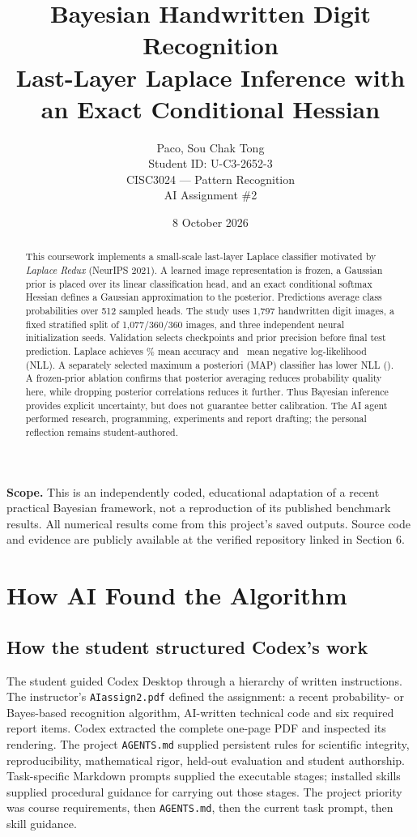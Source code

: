 \documentclass[10pt,a4paper]{article}
\title{\textbf{Bayesian Handwritten Digit Recognition}\\
Last-Layer Laplace Inference with an Exact Conditional Hessian}
\author{Paco, Sou Chak Tong\\Student ID: U-C3-2652-3\\
CISC3024 --- Pattern Recognition\\AI Assignment \#2}
\date{8 October 2026}
\begin{document}
\maketitle
\begin{abstract}
This coursework implements a small-scale last-layer Laplace classifier motivated by
\emph{Laplace Redux} (NeurIPS 2021). A learned image representation is frozen,
a Gaussian prior is placed over its linear classification head, and an exact
conditional softmax Hessian defines a Gaussian approximation to the posterior.
Predictions average class probabilities over 512 sampled heads. The study uses
1,797 handwritten digit images, a fixed stratified split of 1,077/360/360 images,
and three independent neural initialization seeds. Validation selects checkpoints
and prior precision before final test prediction. Laplace achieves
\LaplaceAcc\% mean accuracy and \LaplaceNLL\ mean negative log-likelihood (NLL).
A separately selected maximum a posteriori (MAP) classifier has lower NLL
(\MapNLL). A frozen-prior ablation confirms that posterior averaging reduces
probability quality here, while dropping posterior correlations reduces it further.
Thus Bayesian inference provides explicit uncertainty, but does not guarantee
better calibration. The AI agent performed research, programming, experiments and
report drafting; the personal reflection remains student-authored.
\end{abstract}
\textbf{Scope.} This is an independently coded, educational adaptation of a
recent practical Bayesian framework, not a reproduction of its published
benchmark results. All numerical results come from this project's saved
outputs. Source code and evidence are publicly available at the verified
repository linked in Section 6.
\tableofcontents
\clearpage

\section{How AI Found the Algorithm}
\subsection{How the student structured Codex's work}
The student guided Codex Desktop through a hierarchy of written instructions.
The instructor's \texttt{AIassign2.pdf} defined the assignment: a recent
probability- or Bayes-based recognition algorithm, AI-written technical code and
six required report items. Codex extracted the complete one-page PDF and
inspected its rendering. The project \texttt{AGENTS.md} supplied persistent
rules for scientific integrity, reproducibility, mathematical rigor, held-out
evaluation and student authorship. Task-specific Markdown prompts supplied the
executable stages; installed skills supplied procedural guidance for carrying
out those stages. The project priority was course requirements, then
\texttt{AGENTS.md}, then the current task prompt, then skill guidance.
\end{document}
